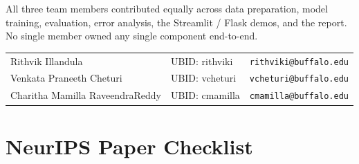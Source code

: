 \documentclass{article}
\begin{document}
All three team members contributed equally across data preparation, model training, evaluation, error analysis, the Streamlit / Flask demos, and the report. No single member owned any single component end-to-end.

\begin{tabular}{lll}
Rithvik Illandula              & UBID: rithviki  & \texttt{rithviki@buffalo.edu} \\
Venkata Praneeth Cheturi       & UBID: vcheturi  & \texttt{vcheturi@buffalo.edu} \\
Charitha Mamilla RaveendraReddy & UBID: cmamilla  & \texttt{cmamilla@buffalo.edu} \\
\end{tabular}

\section*{NeurIPS Paper Checklist}
\end{document}
